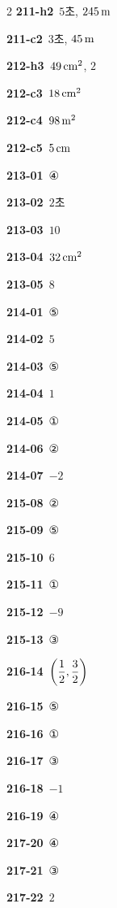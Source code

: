 \documentclass[10pt,a4paper]{article}
\begin{document}
\begin{multicols}{2}
\noindent\textbf{211-h2}\ $5$초, $245\mkern3mu \mathrm{m}$\par
\noindent\textbf{211-c2}\ $3$초, $45\mkern3mu \mathrm{m}$\par
\noindent\textbf{212-h3}\ $49\mkern3mu \mathrm{cm}^2$, $2$\par
\noindent\textbf{212-c3}\ $18\mkern3mu \mathrm{cm}^2$\par
\noindent\textbf{212-c4}\ $98\mkern3mu \mathrm{m}^2$\par
\noindent\textbf{212-c5}\ $5\mkern3mu \mathrm{cm}$\par
\noindent\textbf{213-01}\ ④\par
\noindent\textbf{213-02}\ $2$초\par
\noindent\textbf{213-03}\ $10$\par
\noindent\textbf{213-04}\ $32\mkern3mu \mathrm{cm}^2$\par
\noindent\textbf{213-05}\ $8$\par
\noindent\textbf{214-01}\ ⑤\par
\noindent\textbf{214-02}\ $5$\par
\noindent\textbf{214-03}\ ⑤\par
\noindent\textbf{214-04}\ $1$\par
\noindent\textbf{214-05}\ ①\par
\noindent\textbf{214-06}\ ②\par
\noindent\textbf{214-07}\ $-2$\par
\noindent\textbf{215-08}\ ②\par
\noindent\textbf{215-09}\ ⑤\par
\noindent\textbf{215-10}\ $6$\par
\noindent\textbf{215-11}\ ①\par
\noindent\textbf{215-12}\ $-9$\par
\noindent\textbf{215-13}\ ③\par
\noindent\textbf{216-14}\ $\left(\dfrac{1}{2}{,}\mkern3mu\mathopen{}\dfrac{3}{2}\right)$\par
\noindent\textbf{216-15}\ ⑤\par
\noindent\textbf{216-16}\ ①\par
\noindent\textbf{216-17}\ ③\par
\noindent\textbf{216-18}\ $-1$\par
\noindent\textbf{216-19}\ ④\par
\noindent\textbf{217-20}\ ④\par
\noindent\textbf{217-21}\ ③\par
\noindent\textbf{217-22}\ $2$\par

\end{multicols}
\end{document}
